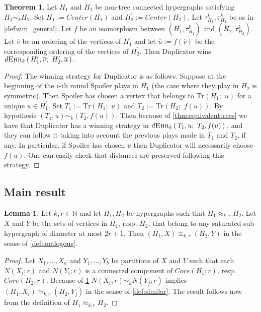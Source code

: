 \documentclass[12pt,notitlepage,a4paper]{article}
\theoremstyle{definition}
\newtheorem{theorem}{Theorem}[section]
\newtheorem{lemma}{Lemma}[section]
\newcommand{\N}{\mathbb{N}}
\newcommand{\ehr}{\textsc{Ehr}}
\newcommand{\sep}{\noindent\rule{2cm}{0.4pt}}
\begin{document}
	\begin{theorem} \label{thm:strategyaux}
		Let $H_1$ and $H_2$ be non-tree 
		connected hypergraphs satisfying
		$H_1\sim_k H_2$. 
		Set $H^\prime_1:= Center(H_1)$ and 
		$H^\prime_2:= Center(H_2)$. Let 
		$\tau^k_{H_1}, \tau^k_{H_2}$ be as in
		\cref{def:sim_general}.
		Let $f$ be an isomorphism
		between $( H^\prime_1,\tau^k_{H_1})$ and 
		$(H^\prime_2,\tau^k_{H_2})$. Let $\overline{v}$ 
		be an ordering of the vertices of $H^\prime_1$ and let
		$\overline{u}:=f(\overline{v})$ be the corresponding
		ordering of the vertices of $H^\prime_2$. Then
		Duplicator wins 
		$	d\ehr_{k}\left(\,
		H^\prime_1,\overline{v};\,\,
		H^\prime_2,\overline{u}\,
		\right).
		$
	\end{theorem}
	\begin{proof}
		The winning strategy for Duplicator is as follows. 
		Suppose at the beginning of the $i$-th round
		Spoiler plays in $H_1$ (the case where they play in
		$H_2$ is symmetric). Then Spoiler has chosen a vertex 
		that belongs to $\mathrm{Tr}(H_1;\,\,u)$ for a unique
		$u\in H^\prime_1$. 
		Set $T_1:=\mathrm{Tr}\left(H_1;\,\,u\right)$ and
		$T_2:=\mathrm{Tr}\left(H_2;\,\,f(u)\right)$.
		By hypothesis
		$(T_1,u)\sim_k (T_2,f(u))$. 
		Then because of \cref{thm:equivalenttrees} we have that
		Duplicator has a winning strategy in
		$
		d\ehr_{k}\left(\,
		T_1,u; \, \, T_2, f(u)\,\right),
		$
		and they can follow it taking into account the previous
		plays made in $T_1$ and $T_2$, if any. In particular, 
		if Spoiler has chosen
		$u$ then Duplicator will necessarily choose $f(u)$.
		One can easily check that distances are preserved
		following this strategy. 
	\end{proof}
		
\subsection{Main result} \label{sec:Core}




\begin{lemma} \label{lem:aux1}
	Let $k,r\in \N$ and let $H_1, H_2$ be hypergraphs such that 
	$H_1\approx_{k,r} H_2$. Let $X$ and $Y$ be the
	sets of vertices in $H_1$, resp. $H_2$, that
	belong to any saturated sub-hypergraph of diameter 
	at most $2r+1$. Then $(H_1,X)\cong_{k,r} (H_2,Y)$ in the sense of
	\cref{def:analogous}.
\end{lemma}
\begin{proof}
	Let $X_1,\dots, X_a$ and $Y_1,\dots, Y_b$ be partitions of
	$X$ and $Y$ such that each $N(X_i;r)$ and $N(Y_i;r)$ is 
	a connected component of $Core(H_1;r)$, resp. $Core(H_2;r)$.
	Because of \cref{thm:strategyaux}
	$N(X_i;r)\sim_k N(Y_j;r)$ implies 
	$(H_1,X_i)\simeq_{k,r} (H_2,Y_j)$ in the sense of
	\cref{def:similar}. The result follows now from
	 the definition of $H_1\approx_{k,r}H_2$.	
\end{proof}
\end{document}

